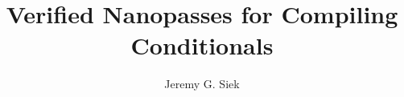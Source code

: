 \documentclass[sigplan,review,dvipsnames,screen,10pt]{acmart}
\begin{document}
\title{Verified Nanopasses for Compiling Conditionals}

\author{Jeremy G. Siek}








\end{document}
